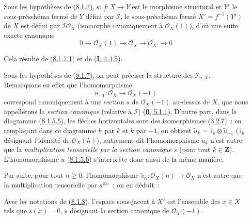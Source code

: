 \begin{corollary}[8.1.8]
\label{II.8.1.8-fr}
Sous les hypothèses de \textup{(\hyperref[II.8.1.7-fr]{8.1.7})}, si $f:X\to Y$ est le
morphisme structural et $Y'$ le sous-préschéma fermé de $Y$ défini par
$\mathcal{I}$, le sous-préschéma fermé $X'=f^{-1}(Y')$ de $X$ est défini par
$\mathcal{I}\mathcal{O}_X$ (isomorphe canoniquement à $\mathcal{O}_X(1)$),
d'où une suite exacte canonique
\begin{equation}
\label{II.8.1.8.1-fr}
  0\to\mathcal{O}_X(1)\to\mathcal{O}_X\to\mathcal{O}_{X'}\to0
\tag{8.1.8.1}
\end{equation}
\end{corollary}

Cela résulte de (\hyperref[II.8.1.7.1-fr]{8.1.7.1}) et de
(\hyperref[I.4.4.5-fr]{\textbf{I}, 4.4.5}).

\begin{env}[8.1.9]
\label{II.8.1.9-fr}
Sous les hypothèses de (\hyperref[II.8.1.7-fr]{8.1.7}), on peut préciser la
structure des $\mathcal{I}_{n,X}$. Remarquons en effet que l'homomorphisme
\[
  \widetilde{u}_{-1}:\mathcal{O}_X\to\mathcal{O}_X(-1)
\]
correspond canoniquement à une section $s$ de $\mathcal{O}_X(-1)$ au-dessus de
$X$, que nous appellerons la \emph{section canonique} (relative à
$\mathcal{I}$) (\hyperref[0.5.1.1-fr]{\textbf{0}, 5.1.1}). D'autre part, dans le
diagramme (\hyperref[II.8.1.5.5-fr]{8.1.5.5}), les flèches horizontales sont
des isomorphismes (\hyperref[II.3.2.7-fr]{3.2.7})~; en remplaçant dans ce
diagramme $h$ par $k$ et $k$ par $-1$, on obtient
$\widetilde{u}_k=1_k\otimes\widetilde{u}_{-1}$ ($1_h$ désignant l'identité de
$\mathcal{O}_X(h)$), autrement dit l'homomorphisme $\widetilde{u}_k$ n'est
autre que la \emph{multiplication tensorielle par la section canonique $s$}
(pour tout $k\in\mathbf{Z}$). L'homomorphisme $\widetilde{u}$
(\hyperref[II.8.1.5.6-fr]{8.1.5.6}) s'interprète donc aussi de la même manière.

Par suite, pour tout $n\geq0$, l'homomorphisme
$\widetilde{v}_n:\mathcal{O}_X(n)\to\mathcal{O}_X$ n'est autre que la
multiplication tensorielle par $s^{\otimes n}$~; on en déduit~:
\end{env}

\begin{corollary}[8.1.10]
\label{II.8.1.10-fr}
Avec les notations de \textup{(\hyperref[II.8.1.8-fr]{8.1.8})}, l'espace sous-jacent à
$X'$ est l'ensemble des $x\in X$ tels que $s(x)=0$, $s$ désignant la section
canonique de $\mathcal{O}_X(-1)$.
\end{corollary}

